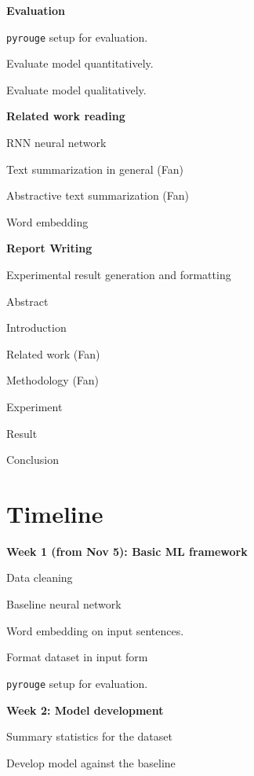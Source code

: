 \noindent
\textbf{Evaluation}
\begin{compactitem}
\item \texttt{pyrouge} setup for evaluation.
\item Evaluate model quantitatively.
\item Evaluate model qualitatively.
\end{compactitem}

\noindent
\textbf{Related work reading}
\begin{compactitem}
\item RNN neural network
\item Text summarization in general (Fan)
\item Abstractive text summarization (Fan)
\item Word embedding
\end{compactitem}

\noindent
\textbf{Report Writing}
\begin{compactitem}
\item Experimental result generation and formatting
\item Abstract
\item Introduction
\item Related work (Fan)
\item Methodology (Fan)
\item Experiment
\item Result
\item Conclusion
\end{compactitem}


\section{Timeline}

\noindent
\textbf{Week 1 (from Nov 5): Basic ML framework}
\begin{compactitem}
\item Data cleaning 
\item Baseline neural network 
\item Word embedding on input sentences.
\item Format dataset in input form 
\item \texttt{pyrouge} setup for evaluation.
\end{compactitem}

\noindent
\textbf{Week 2: Model development}
\begin{compactitem}
\item Summary statistics for the dataset
\item Develop model against the baseline
\end{compactitem}


